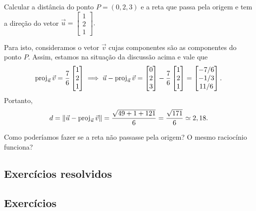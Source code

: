 \documentclass[../livro.tex]{subfiles}  %
\begin{document}
\begin{example}
	Calcular a distância do ponto $P = (0,2,3)$ e a reta que passa pela origem e tem a direção do vetor $\vec{u} =
	\begin{bmatrix}
	1 \\ 2 \\1
	\end{bmatrix}.$
	
	Para isto, consideramos o vetor $\vec{v}$ cujas componentes são as componentes do ponto $P$. Assim, estamos na situação da discussão acima e vale que
	\begin{equation}
	\operatorname{proj}_{\vec{u}} \vec{v} = \frac{7}{6}
	\begin{bmatrix}
	1 \\ 2 \\1
	\end{bmatrix} \implies
	\vec{u} - \operatorname{proj}_{\vec{u}} \vec{v} =
	\begin{bmatrix}
	0 \\ 2 \\ 3
	\end{bmatrix} - \frac{7}{6}
	\begin{bmatrix}
	1 \\ 2 \\1
	\end{bmatrix} =
	\begin{bmatrix}
	-7/6 \\ -1/3 \\ 11/6
	\end{bmatrix}.
	\end{equation} Portanto,
	\begin{equation}
	d = \|\vec{u} - \operatorname{proj}_{\vec{u}} \vec{v}\| = \frac{\sqrt{49 + 1 + 121}}{6} = \frac{\sqrt{171}}{6} \simeq 2,18.
	\end{equation}
\end{example}

\begin{exercise}
	Como poderíamos fazer se a reta não passasse pela origem? O mesmo raciocínio funciona?
\end{exercise}

\subsection*{Exercícios resolvidos}

\construirExeresol

\subsection*{Exercícios}
\end{document}
